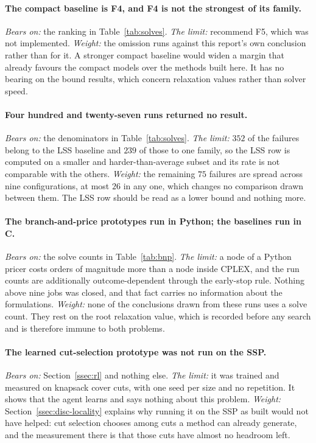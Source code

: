 \paragraph{The compact baseline is F4, and F4 is not the strongest of its family.}
\emph{Bears on:} the ranking in Table~\ref{tab:solves}.
\emph{The limit:} \citet{Catanzaro2015} recommend F5, which was not implemented.
\emph{Weight:} the omission runs against this report's own conclusion rather than for
it. A stronger compact baseline would widen a margin that already favours the compact
models over the methods built here. It has no bearing on the bound results, which
concern relaxation values rather than solver speed.

\paragraph{Four hundred and twenty-seven runs returned no result.}
\emph{Bears on:} the denominators in Table~\ref{tab:solves}.
\emph{The limit:} $352$ of the failures belong to the LSS baseline and $239$ of those to
one family, so the LSS row is computed on a smaller and harder-than-average subset and
its rate is not comparable with the others.
\emph{Weight:} the remaining $75$ failures are spread across nine configurations, at most
$26$ in any one, which changes no comparison drawn between them. The LSS row should be
read as a lower bound and nothing more.

\paragraph{The branch-and-price prototypes run in Python; the baselines run in C.}
\emph{Bears on:} the solve counts in Table~\ref{tab:bnp}.
\emph{The limit:} a node of a Python pricer costs orders of magnitude more than a node
inside CPLEX, and the run counts are additionally outcome-dependent through the
early-stop rule. Nothing above nine jobs was closed, and that fact carries no
information about the formulations.
\emph{Weight:} none of the conclusions drawn from these runs uses a solve count. They
rest on the root relaxation value, which is recorded before any search and is therefore
immune to both problems.

\paragraph{The learned cut-selection prototype was not run on the SSP.}
\emph{Bears on:} Section~\ref{ssec:rl} and nothing else.
\emph{The limit:} it was trained and measured on knapsack cover cuts, with one seed per
size and no repetition. It shows that the agent learns and says nothing about this
problem.
\emph{Weight:} Section~\ref{ssec:disc-locality} explains why running it on the SSP as
built would not have helped: cut selection chooses among cuts a method can already
generate, and the measurement there is that those cuts have almost no headroom left.

